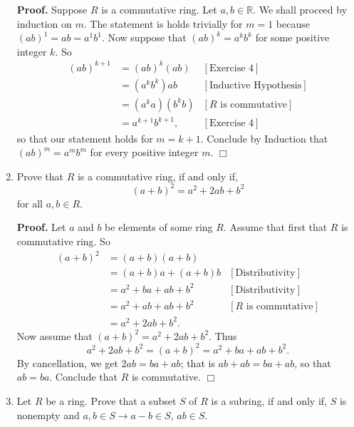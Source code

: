 \documentclass[9pt]{article}
\newcommand{\qed}{\hfill \ensuremath{\Box}}
\newcommand{\R}{\mathbb{R}}
\begin{document}
\begin{enumerate}
      \textbf{Proof.} Suppose $R$ is a commutative ring. Let $a, b \in \R$. We
      shall proceed by induction on $m$. The statement is holds trivially for
      $m = 1$ because $(ab)^1 = ab = a^1b^1$. Now suppose that $(ab)^k = a^kb^k$
      for some positive integer $k$. So
      \begin{align*}
         (ab)^{k+1} &= (ab)^k(ab) &[\text{Exercise 4}] \\
            &= (a^kb^k)ab &[\text{Inductive Hypothesis}] \\
            &= (a^ka)(b^kb) &[R \text{ is commutative}] \\
            &= a^{k+1}b^{k+1}, &[\text{Exercise 4}]
      \end{align*}
      so that our statement holds for $m = k + 1$. Conclude by Induction that
      $(ab)^m = a^mb^m$ for every positive integer $m$. \qed
   \item Prove that $R$ is a commutative ring, if and only if,
         $$(a + b)^2 = a^2 + 2ab + b^2$$
         for all
         $a, b \in R$.

      \textbf{Proof.} Let $a$ and $b$ be elements of some ring $R$. Assume that 
      first that $R$ is commutative ring. So
      \begin{align*}
         (a + b)^2 &= (a + b)(a + b) \\
            &= (a + b)a + (a + b)b &[\text{Distributivity}] \\
            &= a^2 + ba + ab + b^2 &[\text{Distributivity}] \\
            &= a^2 + ab + ab + b^2 &[R \text{ is commutative}] \\
            &= a^2 + 2ab +b^2.
      \end{align*}
      Now assume that $(a + b)^2 = a^2 + 2ab + b^2$. Thus
      $$a^2 + 2ab + b^2 = (a + b)^2 = a^2 + ba + ab + b^2.$$
      By cancellation, we get $2ab = ba + ab$; that is $ab + ab = ba + ab$, so
      that $ab = ba$. Conclude that $R$ is commutative. \qed
   \item Let $R$ be a ring. Prove that a subset $S$ of $R$ is a subring, if and
         only if, $S$ is nonempty and $a, b \in S \rightarrow a - b \in S$,
         $ab \in S$.


\end{enumerate}
\end{document}
